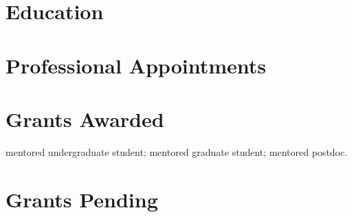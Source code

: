 


\newcommand{\longcontent}[1]{}

\newcommand{\oldcontent}[1]{}

\newcommand{\docTitle}{Curriculum Vitae\xspace}


\singlespacing



\section*{Education}


\section*{Professional Appointments}


% 

% 

% 

\section*{Grants Awarded}
\ugsymbol{}mentored undergraduate student;
\phdsymbol{}mentored graduate student;
\postdocsymbol{}mentored postdoc.



\section*{Grants Pending}


